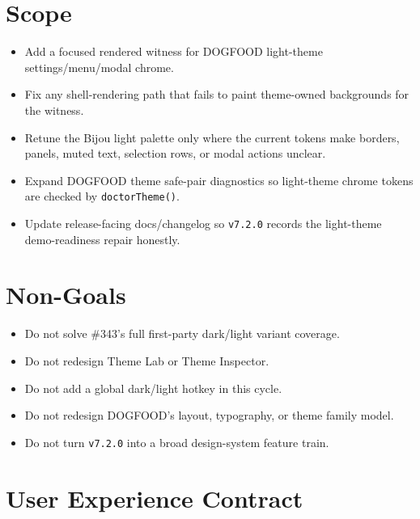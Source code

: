 \section{Scope}\label{record-182-scope}

\begin{itemize}
\tightlist
\item
  Add a focused rendered witness for DOGFOOD light-theme settings/menu/modal chrome.
\item
  Fix any shell-rendering path that fails to paint theme-owned backgrounds for the witness.
\item
  Retune the Bijou light palette only where the current tokens make borders, panels, muted text, selection rows, or modal actions unclear.
\item
  Expand DOGFOOD theme safe-pair diagnostics so light-theme chrome tokens are checked by \texttt{d\allowbreak{}o\allowbreak{}c\allowbreak{}t\allowbreak{}o\allowbreak{}r\allowbreak{}T\allowbreak{}h\allowbreak{}e\allowbreak{}m\allowbreak{}e\allowbreak{}(\allowbreak{})}.
\item
  Update release-facing docs/changelog so \texttt{v\allowbreak{}7\allowbreak{}.\allowbreak{}2\allowbreak{}.\allowbreak{}0} records the light-theme demo-readiness repair honestly.
\end{itemize}

\section{Non-Goals}\label{record-182-non-goals}

\begin{itemize}
\tightlist
\item
  Do not solve \#343's full first-party dark/light variant coverage.
\item
  Do not redesign Theme Lab or Theme Inspector.
\item
  Do not add a global dark/light hotkey in this cycle.
\item
  Do not redesign DOGFOOD's layout, typography, or theme family model.
\item
  Do not turn \texttt{v\allowbreak{}7\allowbreak{}.\allowbreak{}2\allowbreak{}.\allowbreak{}0} into a broad design-system feature train.
\end{itemize}

\section{User Experience Contract}\label{record-182-user-experience-contract}

